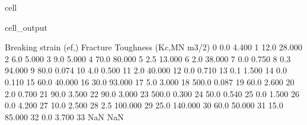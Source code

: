 \documentclass[letterpaper,10pt,english]{jupyterBook}
\begin{document}
{{\begin{sphinxuseclass}{cell}
\begin{sphinxVerbatimOutput}
\begin{sphinxuseclass}{cell_output}
\begin{sphinxVerbatim}[commandchars=\\\{\}]
    Breaking strain (ef,\PYGZpc{})  Fracture Toughness (Kc,MN m\PYGZhy{}3/2)  \PYGZbs{}
0                      0.0                             4.400   
1                     12.0                            28.000   
2                      6.0                             5.000   
3                      9.0                             5.000   
4                     70.0                            80.000   
5                      2.5                            13.000   
6                      2.0                            38.000   
7                      0.0                             0.750   
8                      0.3                            94.000   
9                     80.0                             0.074   
10                     4.0                             0.500   
11                     2.0                            40.000   
12                     0.0                             0.710   
13                     0.1                             1.500   
14                     0.0                             0.110   
15                    60.0                            40.000   
16                    30.0                            93.000   
17                     5.0                             3.000   
18                   500.0                             0.087   
19                    60.0                             2.600   
20                     2.0                             0.700   
21                    90.0                             3.500   
22                    90.0                             3.000   
23                   500.0                             0.300   
24                    50.0                             0.540   
25                     0.0                             1.500   
26                     0.0                             4.200   
27                    10.0                             2.500   
28                     2.5                           100.000   
29                    25.0                           140.000   
30                    60.0                            50.000   
31                    15.0                            85.000   
32                     0.0                             3.700   
33                     NaN                               NaN   


\end{sphinxVerbatim}
\end{sphinxuseclass}
\end{sphinxVerbatimOutput}
\end{sphinxuseclass}}}
\end{document}

